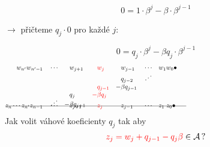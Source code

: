 \documentclass[11pt]{beamer}
\begin{document}
\begin{frame}
    $$0=1\cdot \beta^j -\beta \cdot \beta^{j-1}$$%
    
    $\rightarrow$ přičteme $q_j\cdot 0$ pro každé $j$:
    
    $$0=q_j\cdot \beta^j -\beta  q_j \cdot \beta^{j-1}$$
    \begin{align*}
        w_{n'} w_{n'-1}&&&\cdots& &w_{j+1}&\!\! &\textcolor{red}{w_j}  & \!\!  &w_{j-1} &&\cdots &&w_1 w_0\bullet \hspace{200pt}\\[-5pt]
                   &&&&       &       & &     &   &q_{j-2} &&\iddots\\[-3pt] 
                   &&&&       &       & &\textcolor{red}{q_{j-1}}& -&\beta q_{j-1} \\[-3pt]
                   &&&&         &q_j&   \textcolor{red}{-}&\textcolor{red}{\beta q_j} &&\\[-8pt]
                   &&&  \iddots      &   -&\beta q_{j+1}&   &\ &&\\[-17pt]
    \intertext{\line(1,0){280}}
    \vspace{-15pt}
    \\[-30pt]
     z_{n} \cdots z_{n'} z_{n-1}&&&\cdots& &z_{j+1}& &\textcolor{red}{z_j}& &z_{j-1} &&\cdots &&z_1 \; z_0\bullet                            
    \end{align*}
    \pause
    Jak volit váhové koeficienty $q_j$ tak aby
    $$
        \textcolor{red}{z_j=w_j + q_{j-1} - q_j \beta} \in \mathcal{A}\,?
    $$
        
\end{frame}
\end{document}
